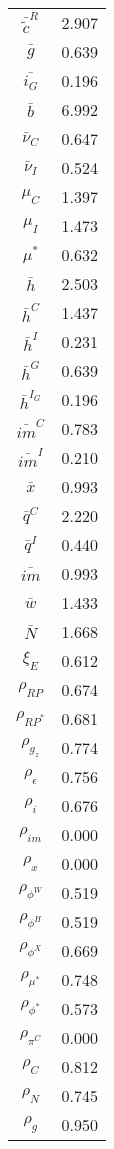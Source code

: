 \begin{center}
\begin{longtable}{cc}
$\bar{\tilde{c}}^R$ 	 & 	 2.907 \\
$\bar{g}$ 	 & 	 0.639 \\
$\bar{i_G}$ 	 & 	 0.196 \\
$\bar{b}$ 	 & 	 6.992 \\
$\bar{\nu}_C$ 	 & 	 0.647 \\
$\bar{\nu}_I$ 	 & 	 0.524 \\
$\mu_C$ 	 & 	 1.397 \\
$\mu_I$ 	 & 	 1.473 \\
$\mu^*$ 	 & 	 0.632 \\
$\bar{h}$ 	 & 	 2.503 \\
$\bar{h}^C$ 	 & 	 1.437 \\
$\bar{h}^I$ 	 & 	 0.231 \\
$\bar{h}^G$ 	 & 	 0.639 \\
$\bar{h}^{I_G}$ 	 & 	 0.196 \\
$\bar{im}^C$ 	 & 	 0.783 \\
$\bar{im}^I$ 	 & 	 0.210 \\
$\bar{x}$ 	 & 	 0.993 \\
$\bar{q}^C$ 	 & 	 2.220 \\
$\bar{q}^I$ 	 & 	 0.440 \\
$\bar{im}$ 	 & 	 0.993 \\
$\bar{w}$ 	 & 	 1.433 \\
$\bar{N}$ 	 & 	 1.668 \\
$\xi_E$ 	 & 	 0.612 \\
$\rho_{RP}$ 	 & 	 0.674 \\
$\rho_{RP^*}$ 	 & 	 0.681 \\
$\rho_{g_z}$ 	 & 	 0.774 \\
$\rho_{\epsilon}$ 	 & 	 0.756 \\
$\rho_{i}$ 	 & 	 0.676 \\
$\rho_{im}$ 	 & 	 0.000 \\
$\rho_{x}$ 	 & 	 0.000 \\
$\rho_{\phi^W}$ 	 & 	 0.519 \\
$\rho_{\phi^H}$ 	 & 	 0.519 \\
$\rho_{\phi^X}$ 	 & 	 0.669 \\
$\rho_{\mu^*}$ 	 & 	 0.748 \\
$\rho_{\phi^*}$ 	 & 	 0.573 \\
$\rho_{\pi^C}$ 	 & 	 0.000 \\
$\rho_{C}$ 	 & 	 0.812 \\
$\rho_{N}$ 	 & 	 0.745 \\
$\rho_{g}$ 	 & 	 0.950 \\

\end{longtable}
\end{center}
